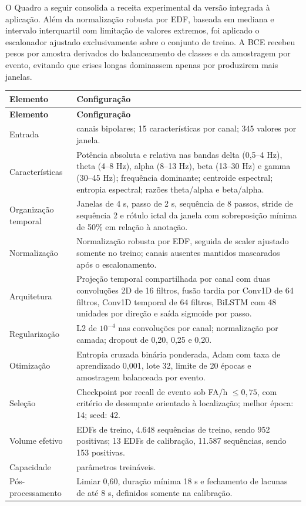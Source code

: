 O Quadro a seguir consolida a receita experimental da versão integrada à aplicação. Além da normalização robusta por EDF, baseada em mediana e intervalo interquartil com limitação de valores extremos, foi aplicado o escalonador ajustado exclusivamente sobre o conjunto de treino. A BCE recebeu pesos por amostra derivados do balanceamento de classes e da amostragem por evento, evitando que crises longas dominassem apenas por produzirem mais janelas.

\FloatBarrier{}
\nopagebreak[4]
\begingroup
\fontsize{10}{12}\selectfont
\setlength{\tabcolsep}{4pt}
\renewcommand{\arraystretch}{1.15}
\addtocounter{table}{-1}
\begin{longtable}{|>{\raggedright\arraybackslash}p{}|>{\raggedright\arraybackslash}p{}|}
\hline
\textbf{Elemento} & \textbf{Configuração} \\ \hline
\endfirsthead
\hline
\textbf{Elemento} & \textbf{Configuração} \\ \hline
\endhead
Entrada & 23 canais bipolares; 15 características por canal; 345 valores por janela. \\ \hline
Características & Potência absoluta e relativa nas bandas delta (0,5--4 Hz), theta (4--8 Hz), alpha (8--13 Hz), beta (13--30 Hz) e gamma (30--45 Hz); frequência dominante; centroide espectral; entropia espectral; razões theta/alpha e beta/alpha. \\ \hline
Organização temporal & Janelas de 4 s, passo de 2 s, sequência de 8 passos, stride de sequência 2 e rótulo ictal da janela com sobreposição mínima de 50\% em relação à anotação. \\ \hline
Normalização & Normalização robusta por EDF, seguida de scaler ajustado somente no treino; canais ausentes mantidos mascarados após o escalonamento. \\ \hline
Arquitetura & Projeção temporal compartilhada por canal com duas convoluções 2D de 16 filtros, fusão tardia por Conv1D de 64 filtros, Conv1D temporal de 64 filtros, BiLSTM com 48 unidades por direção e saída sigmoide por passo. \\ \hline
Regularização & L2 de $10^{-4}$ nas convoluções por canal; normalização por camada; dropout de 0,20, 0,25 e 0,20. \\ \hline
Otimização & Entropia cruzada binária ponderada, Adam com taxa de aprendizado 0,001, lote 32, limite de 20 épocas e amostragem balanceada por evento. \\ \hline
Seleção & Checkpoint por recall de evento sob FA/h $\leq 0{,}75$, com critério de desempate orientado à localização; melhor época: 14; seed: 42. \\ \hline
Volume efetivo & 77 EDFs de treino, 4.648 sequências de treino, sendo 952 positivas; 13 EDFs de calibração, 11.587 sequências, sendo 153 positivas. \\ \hline
Capacidade & 84.081 parâmetros treináveis. \\ \hline
Pós-processamento & Limiar 0,60, duração mínima 18 s e fechamento de lacunas de até 8 s, definidos somente na calibração. \\ \hline
\end{longtable}
